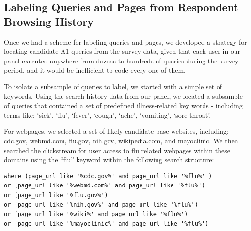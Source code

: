 \documentclass[12pt]{article}
\begin{document}
\subsection{Labeling Queries and Pages from Respondent Browsing History}

Once we had a scheme for labeling queries and pages, we developed a strategy for locating candidate A1 queries from the survey data, given that each user in our panel executed anywhere from dozens to hundreds of queries during the survey period, and it would be inefficient to code every one of them. 

To isolate a subsample of queries to label, we started with a simple set of keywords. Using the search history data from our panel, we located a subsample of queries that contained a set of predefined illness-related key words - including terms like: `sick', `flu', `fever', `cough', `ache', `vomiting', `sore throat'. 


For webpages, we selected a set of likely candidate base websites, including: cdc.gov, webmd.com, flu.gov, nih.gov, wikipedia.com, and mayoclinic. We then searched the clickstream for user access to flu related webpages within these domains using the ``flu'' keyword within the following search structure:

\begin{lstlisting}
where (page_url like '%cdc.gov%' and page_url like '%flu%' )
or (page_url like '%webmd.com%' and page_url like '%flu%')
or (page_url like '%flu.gov%')
or (page_url like '%nih.gov%' and page_url like '%flu%')
or (page_url like '%wiki%' and page_url like '%flu%')
or (page_url like '%mayoclinic%' and page_url like '%flu%')
\end{lstlisting} 
\end{document}
